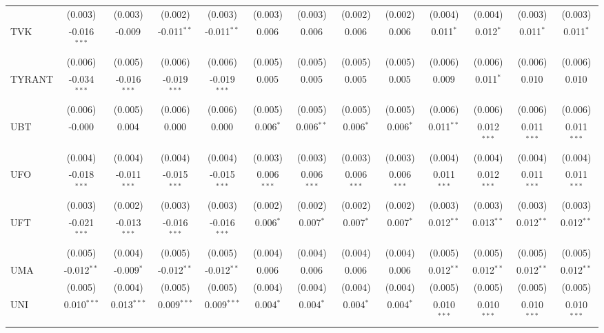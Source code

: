 \begin{table}[!htbp]
\begin{tabular}{@{\extracolsep{5pt}}lcccccccccccc}
  & (0.003) & (0.003) & (0.002) & (0.003) & (0.003) & (0.003) & (0.002) & (0.002) & (0.004) & (0.004) & (0.003) & (0.003) \\
 TVK & -0.016$^{***}$ & -0.009$^{}$ & -0.011$^{**}$ & -0.011$^{**}$ & 0.006$^{}$ & 0.006$^{}$ & 0.006$^{}$ & 0.006$^{}$ & 0.011$^{*}$ & 0.012$^{*}$ & 0.011$^{*}$ & 0.011$^{*}$ \\
  & (0.006) & (0.005) & (0.006) & (0.006) & (0.005) & (0.005) & (0.005) & (0.005) & (0.006) & (0.006) & (0.006) & (0.006) \\
 TYRANT & -0.034$^{***}$ & -0.016$^{***}$ & -0.019$^{***}$ & -0.019$^{***}$ & 0.005$^{}$ & 0.005$^{}$ & 0.005$^{}$ & 0.005$^{}$ & 0.009$^{}$ & 0.011$^{*}$ & 0.010$^{}$ & 0.010$^{}$ \\
  & (0.006) & (0.005) & (0.006) & (0.006) & (0.005) & (0.005) & (0.005) & (0.005) & (0.006) & (0.006) & (0.006) & (0.006) \\
 UBT & -0.000$^{}$ & 0.004$^{}$ & 0.000$^{}$ & 0.000$^{}$ & 0.006$^{*}$ & 0.006$^{**}$ & 0.006$^{*}$ & 0.006$^{*}$ & 0.011$^{**}$ & 0.012$^{***}$ & 0.011$^{***}$ & 0.011$^{***}$ \\
  & (0.004) & (0.004) & (0.004) & (0.004) & (0.003) & (0.003) & (0.003) & (0.003) & (0.004) & (0.004) & (0.004) & (0.004) \\
 UFO & -0.018$^{***}$ & -0.011$^{***}$ & -0.015$^{***}$ & -0.015$^{***}$ & 0.006$^{***}$ & 0.006$^{***}$ & 0.006$^{***}$ & 0.006$^{***}$ & 0.011$^{***}$ & 0.012$^{***}$ & 0.011$^{***}$ & 0.011$^{***}$ \\
  & (0.003) & (0.002) & (0.003) & (0.003) & (0.002) & (0.002) & (0.002) & (0.002) & (0.003) & (0.003) & (0.003) & (0.003) \\
 UFT & -0.021$^{***}$ & -0.013$^{***}$ & -0.016$^{***}$ & -0.016$^{***}$ & 0.006$^{*}$ & 0.007$^{*}$ & 0.007$^{*}$ & 0.007$^{*}$ & 0.012$^{**}$ & 0.013$^{**}$ & 0.012$^{**}$ & 0.012$^{**}$ \\
  & (0.005) & (0.004) & (0.005) & (0.005) & (0.004) & (0.004) & (0.004) & (0.004) & (0.005) & (0.005) & (0.005) & (0.005) \\
 UMA & -0.012$^{**}$ & -0.009$^{*}$ & -0.012$^{**}$ & -0.012$^{**}$ & 0.006$^{}$ & 0.006$^{}$ & 0.006$^{}$ & 0.006$^{}$ & 0.012$^{**}$ & 0.012$^{**}$ & 0.012$^{**}$ & 0.012$^{**}$ \\
  & (0.005) & (0.004) & (0.005) & (0.005) & (0.004) & (0.004) & (0.004) & (0.004) & (0.005) & (0.005) & (0.005) & (0.005) \\
 UNI & 0.010$^{***}$ & 0.013$^{***}$ & 0.009$^{***}$ & 0.009$^{***}$ & 0.004$^{*}$ & 0.004$^{*}$ & 0.004$^{*}$ & 0.004$^{*}$ & 0.010$^{***}$ & 0.010$^{***}$ & 0.010$^{***}$ & 0.010$^{***}$ \\

\end{tabular}
\end{table}
